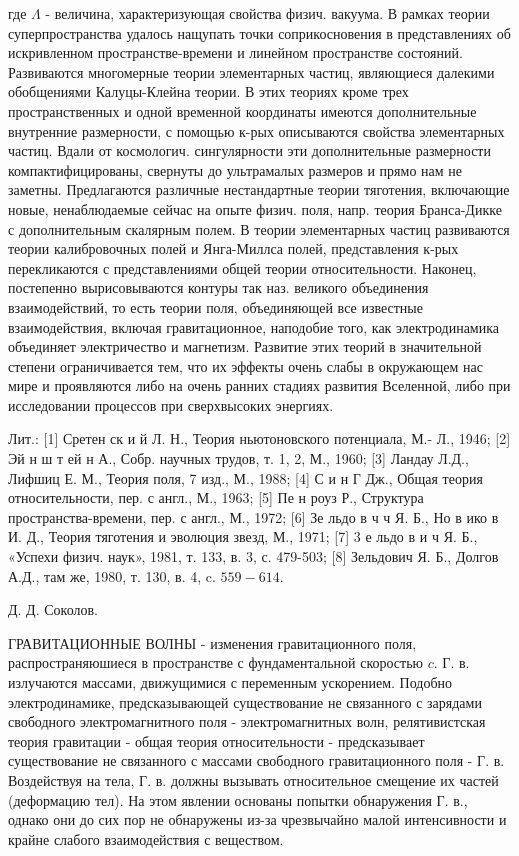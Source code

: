 \documentclass[10pt]{article}
\begin{document}
где $\Lambda$ - величина, характеризующая свойства физич. вакуума. В рамках теории суперпространства удалось нащупать точки соприкосновения в представлениях об искривленном пространстве-времени и линейном пространстве состояний. Развиваются многомерные теории элементарных частиц, являющиеся далекими обобщениями Калуцы-Клейна теории. В этих теориях кроме трех пространственных и одной временной координаты имеются дополнительные внутренние размерности, с помощью к-рых описываются свойства элементарных частиц. Вдали от космологич. сингулярности эти дополнительные размерности компактифицированы, свернуты до ультрамалых размеров и прямо нам не заметны. Предлагаются различные нестандартные теории тяготения, включающие новые, ненаблюдаемые сейчас на опыте физич. поля, напр. теория Бранса-Дикке с дополнительным скалярным полем. В теории элементарных частиц развиваются теории калибровочных полей и Янга-Миллса полей, представления к-рых перекликаются с представлениями общей теории относительности. Наконец, постепенно вырисовываются контуры так наз. великого объединения взаимодействий, то есть теории поля, объединяющей все известные взаимодействия, включая гравитационное, наподобие того, как электродинамика объединяет электричество и магнетизм. Развитие этих теорий в значительной степени ограничивается тем, что их эффекты очень слабы в окружающем нас мире и проявляются либо на очень ранних стадиях развития Вселенной, либо при исследовании процессов при сверхвысоких энергиях.



Лит.: [1] Сретен ск и й Л. Н., Теория ньютоновского потенциала, М.- Л., 1946; [2] Эй н ш т ей н А., Собр. научных трудов, т. 1, 2, М., 1960; [3] Ландау Л.Д., Лифшиц Е. М., Теория поля, 7 изд., М., 1988; [4] С и н Г Дж., Общая теория относительности, пер. с англ., М., 1963; [5] Пе н роуз Р., Структура пространства-времени, пер. с англ., М., 1972; [6] Зе льдо в ч ч Я. Б., Но в ико в И. Д., Теория тяготения и эволюция звезд, М., 1971; [7] 3 е льдо в и ч Я. Б., «Успехи физич. наук», 1981, т. 133, в. 3, с. 479-503; [8] Зельдович Я. Б., Долгов А.Д., там же, 1980, т. 130, в. 4, c. $559-614$.



Д. Д. Соколов.



ГРАВИТАЦИОННЫЕ ВОЛНЫ - изменения гравитационного поля, распространяюшиеся в пространстве с фундаментальной скоростью $c$. Г. в. излучаются массами, движущимися с переменным ускорением. Подобно электродинамике, предсказывающей существование не связанного с зарядами свободного электромагнитного поля - электромагнитных волн, релятивистская теория гравитации - общая теория относительности - предсказывает существование не связанного с массами свободного гравитационного поля - Г. в. Воздействуя на тела, Г. в. должны вызывать относительное смещение их частей (деформацию тел). На этом явлении основаны попытки обнаружения Г. в., однако они до сих пор не обнаружены из-за чрезвычайно малой интенсивности и крайне слабого взаимодействия с веществом.
\end{document}
